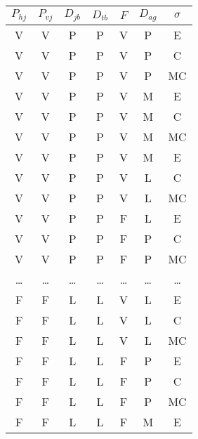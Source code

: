 \begin{table}[hbt]
    \centering
    \begin{tabular}{c|c|c|c|c|c|c}
        $P_{hj}$    &   $P_{vj}$    &   $D_{jb}$    &   $D_{tb}$    &   $F$         &   $D_{ag}$    &   $\sigma$ \\ \hline
        V  &   V  &   P       &   P       &   V  &   P       &   E \\
        V  &   V  &   P       &   P       &   V  &   P       &   C \\
        V  &   V  &   P       &   P       &   V  &   P       &   MC \\
        V  &   V  &   P       &   P       &   V  &   M       &   E \\
        V  &   V  &   P       &   P       &   V  &   M       &   C \\
        V  &   V  &   P       &   P       &   V  &   M       &   MC \\
        V  &   V  &   P       &   P       &   V  &   M       &   E \\
        V  &   V  &   P       &   P       &   V  &   L       &   C \\
        V  &   V  &   P       &   P       &   V  &   L       &   MC \\
        V  &   V  &   P       &   P       &   F       &   L       &   E \\
        V  &   V  &   P       &   P       &   F       &   P       &   C \\
        V  &   V  &   P       &   P       &   F       &   P       &   MC \\
        \dots       &   \dots       &   \dots       &   \dots       &   \dots
        &   \dots       &   \dots \\
        F       &   F       &   L       &   L       &   V  &   L       &   E \\
        F       &   F       &   L       &   L       &   V  &   L       &   C \\
        F       &   F       &   L       &   L       &   V  &   L       &   MC \\
        F       &   F       &   L       &   L       &   F       &   P       &   E \\
        F       &   F       &   L       &   L       &   F       &   P       &   C \\
        F       &   F       &   L       &   L       &   F       &   P       &   MC \\
        F       &   F       &   L       &   L       &   F       &   M       &   E \\

\end{tabular}
\end{table}
